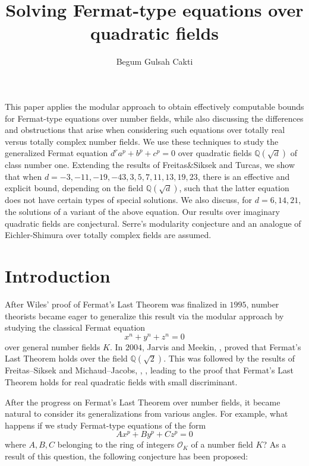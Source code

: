 \documentclass[]{article}
\title{Solving Fermat-type equations over quadratic fields}
\author{Begum Gulsah Cakti}
\date{}
\makeatletter
\newcommand {\QQ}{{\mathbb{Q}}}
\newcommand {\mcalO}{{\mathcal{O}}}
\let\oldabstract\abstract
\let\oldendabstract\endabstract
\renewenvironment{abstract}
{\renewenvironment{quotation}%
               {\list{}{\addtolength{\leftmargin}{1em} %
                        \listparindent 1.5em%
                        \itemindent    \listparindent%
                        \rightmargin   \leftmargin%
                        \parsep        \z@ \@plus\p@}%
                \item\relax}%
               {\endlist}%
\oldabstract}
{\oldendabstract}
\makeatother
\begin{document}
\maketitle

    

\begin{abstract}
    This paper applies the modular approach to obtain effectively computable bounds for Fermat-type equations over number fields, while also discussing the differences and obstructions that arise when considering such equations over totally real versus totally complex number fields. We use these techniques to study the generalized Fermat equation $d^ra^p+b^p+c^p=0$ over quadratic fields $\QQ(\sqrt{d})$ of class number one. Extending the results of Freitas\&Siksek and Turcas, we show that when $d=-3,-11,-19,-43,3,5,7,11,13,19,23$, there is an effective and explicit bound, depending on the field $\QQ(\sqrt{d})$, such that the latter equation does not have certain types of special solutions. We also discuss, for $d=6,14,21$, the solutions of a variant of the above equation. Our results over imaginary quadratic fields are conjectural. Serre's modularity conjecture and an analogue of Eichler-Shimura over totally complex fields are assumed. 
\end{abstract}




\section{Introduction}

After Wiles' proof of Fermat's Last Theorem was finalized in $1995$, number theorists became eager to generalize this result via the modular approach by studying the classical Fermat equation 
\begin{equation}\label{fermat}
 x^n+y^n+z^n=0  
\end{equation}over general number fields $K$. In $2004$, Jarvis and Meekin, \cite{jarvis2004fermat}, proved that Fermat's Last Theorem holds over the field $\QQ(\sqrt{2})$. This was followed by the results of Freitas–Siksek and Michaud–Jacobs, \cite{freitas2015fermat}, \cite{michaud2021fermat}, leading to the proof that Fermat’s Last Theorem holds for real quadratic fields with small discriminant. 

After the progress on Fermat’s Last Theorem over number fields, it became natural to consider its generalizations from various angles. For example, what happens if we study Fermat-type equations of the form 
\begin{equation}\label{genfermeq}
  Ax^p+By^p+Cz^p=0  
\end{equation}where $A,B,C$ belonging to the ring of integers $\mcalO_K$ of a number field $K$? As a result of this question, the following conjecture has been proposed:
\end{document}
